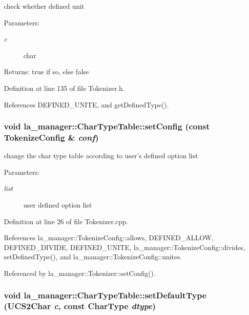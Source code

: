 check whether defined unit 

\begin{Desc}
\item[Parameters:]
\begin{description}
\item[{\em c}]char \end{description}
\end{Desc}
\begin{Desc}
\item[Returns:]true if so, else false \end{Desc}


Definition at line 135 of file Tokenizer.h.

References DEFINED\_\-UNITE, and getDefinedType().\hypertarget{classla__manager_1_1CharTypeTable_53548c650bdf26954fe3b4443290827c}{
\subsubsection[{setConfig}]{\setlength{\rightskip}{0pt plus 5cm}void la\_\-manager::CharTypeTable::setConfig (const {\bf TokenizeConfig} \& {\em conf})}}
\label{classla__manager_1_1CharTypeTable_53548c650bdf26954fe3b4443290827c}


change the char type table according to user's defined option list 

\begin{Desc}
\item[Parameters:]
\begin{description}
\item[{\em list}]user defined option list \end{description}
\end{Desc}


Definition at line 26 of file Tokenizer.cpp.

References la\_\-manager::TokenizeConfig::allows, DEFINED\_\-ALLOW, DEFINED\_\-DIVIDE, DEFINED\_\-UNITE, la\_\-manager::TokenizeConfig::divides, setDefinedType(), and la\_\-manager::TokenizeConfig::unites.

Referenced by la\_\-manager::Tokenizer::setConfig().\hypertarget{classla__manager_1_1CharTypeTable_6f3e4cc8a2f71aee53a5abf4734a2757}{
\subsubsection[{setDefaultType}]{\setlength{\rightskip}{0pt plus 5cm}void la\_\-manager::CharTypeTable::setDefaultType (UCS2Char {\em c}, \/  const {\bf CharType} {\em dtype})}}
\label{classla__manager_1_1CharTypeTable_6f3e4cc8a2f71aee53a5abf4734a2757}


